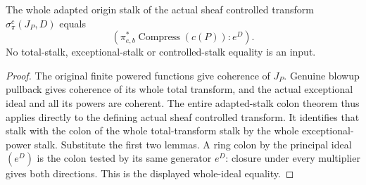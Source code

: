 \begin{theorem}
\label{hir:actual-point-weighted-controlled-stalk-colon}
\leanok
The whole adapted origin stalk of the actual sheaf controlled transform
$\sigma^c_\pi(J_P,D)$ equals
\[
 (\pi_{e,b}^*\operatorname{Compress}(c(P)):e^D).
\]
No total-stalk, exceptional-stalk or controlled-stalk equality is an input.
\end{theorem}
\begin{proof}
The original finite powered functions give coherence of $J_P$. Genuine
blowup pullback gives coherence of its whole total transform, and the
actual exceptional ideal and all its powers are coherent. The entire
adapted-stalk colon theorem thus applies directly to the defining actual
sheaf controlled transform. It identifies that stalk with the colon of the
whole total-transform stalk by the whole exceptional-power stalk. Substitute
the first two lemmas. A ring colon by the principal ideal $(e^D)$ is the
colon tested by its same generator $e^D$: closure under every multiplier
gives both directions. This is the displayed whole-ideal equality.
\end{proof}